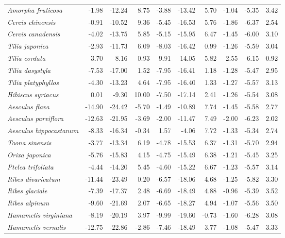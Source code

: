 \documentclass[11pt]{article}
\begin{document}
\begin{longtable}{lrrrrrrrrr}
  \emph{Amorpha fruticosa} & -1.98 & -12.24 & 8.75 & -3.88 & -13.42 & 5.70 & -1.04 & -5.35 & 3.42 \\ 
  \emph{Cercis chinensis} & -0.91 & -10.52 & 9.36 & -5.45 & -16.53 & 5.76 & -1.86 & -6.37 & 2.54 \\ 
  \emph{Cercis canadensis} & -4.02 & -13.75 & 5.85 & -5.15 & -15.95 & 6.47 & -1.45 & -6.00 & 3.10 \\ 
  \emph{Tilia japonica} & -2.93 & -11.73 & 6.09 & -8.03 & -16.42 & 0.99 & -1.26 & -5.59 & 3.04 \\ 
  \emph{Tilia cordata} & -3.70 & -8.16 & 0.93 & -9.91 & -14.05 & -5.82 & -2.55 & -6.15 & 0.92 \\ 
  \emph{Tilia dasystyla} & -7.53 & -17.00 & 1.52 & -7.95 & -16.41 & 1.18 & -1.28 & -5.47 & 2.95 \\ 
  \emph{Tilia platyphyllos} & -4.30 & -13.23 & 4.64 & -7.95 & -16.40 & 1.33 & -1.27 & -5.57 & 3.13 \\ 
  \emph{Hibiscus syriacus} & 0.01 & -9.30 & 10.00 & -7.50 & -17.14 & 2.41 & -1.26 & -5.54 & 3.08 \\ 
  \emph{Aesculus flava} & -14.90 & -24.42 & -5.70 & -1.49 & -10.89 & 7.74 & -1.45 & -5.58 & 2.77 \\ 
  \emph{Aesculus parviflora} & -12.63 & -21.95 & -3.69 & -2.00 & -11.47 & 7.49 & -2.00 & -6.23 & 2.02 \\ 
  \emph{Aesculus hippocastanum} & -8.33 & -16.34 & -0.34 & 1.57 & -4.06 & 7.72 & -1.33 & -5.34 & 2.74 \\ 
  \emph{Toona sinensis} & -3.77 & -13.34 & 6.19 & -4.78 & -15.53 & 6.37 & -1.31 & -5.70 & 2.94 \\ 
  \emph{Orixa japonica} & -5.76 & -15.83 & 4.15 & -4.75 & -15.49 & 6.38 & -1.21 & -5.45 & 3.25 \\ 
  \emph{Ptelea trifoliata} & -4.44 & -14.20 & 5.45 & -4.60 & -15.22 & 6.67 & -1.23 & -5.57 & 3.14 \\ 
  \emph{Ribes divaricatum} & -11.44 & -23.49 & 0.20 & -6.57 & -18.06 & 4.68 & -1.25 & -5.82 & 3.30 \\ 
  \emph{Ribes glaciale} & -7.39 & -17.37 & 2.48 & -6.69 & -18.49 & 4.88 & -0.96 & -5.39 & 3.52 \\ 
  \emph{Ribes alpinum} & -9.60 & -21.69 & 2.07 & -6.65 & -18.27 & 4.94 & -1.07 & -5.56 & 3.50 \\ 
  \emph{Hamamelis virginiana} & -8.19 & -20.19 & 3.97 & -9.99 & -19.60 & -0.73 & -1.60 & -6.28 & 3.08 \\ 
  \emph{Hamamelis vernalis} & -12.75 & -22.86 & -2.86 & -7.46 & -18.49 & 3.77 & -1.08 & -5.47 & 3.33 \\ 

\end{longtable}
\end{document}
